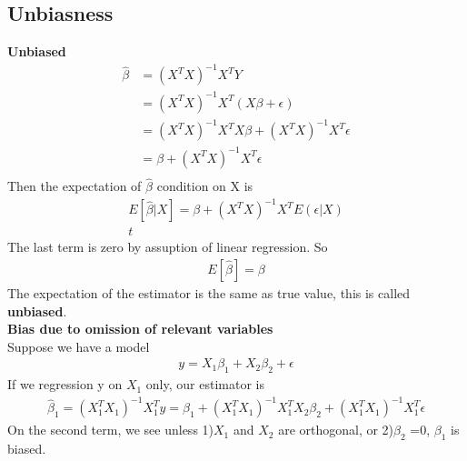 \documentclass[a4paper]{article}
\begin{document}
\subsection{Unbiasness}
{\bf Unbiased}\\
\begin{align*}
\hat \beta & = (X^T X)^{-1}X^TY\\
               & = (X^T X)^{-1}X^T(X \beta + \epsilon)\\
               & = (X^T X)^{-1}X^T X \beta   + (X^T X)^{-1}X^T \epsilon\\
               & = \beta +  (X^T X)^{-1}X^T \epsilon\\
\end{align*}
Then the expectation of $\hat \beta$ condition on X is
\begin{align*}
E[{\hat \beta|X}] = \beta + (X^TX)^{-1} X^T E(\epsilon|X)\\t
\end{align*}
The last term is zero by assuption of linear regression. So 
\begin{align*}
E[\hat \beta] = \beta
\end{align*}
The expectation of the estimator is the same as true value, this is called {\bf unbiased}. \\
{\bf Bias due to omission of relevant variables}\\
Suppose we have a model
\begin{align*}
y = X_1 \beta_1 + X_2 \beta_2 + \epsilon
\end{align*}
If we regression y on $X_1$ only, our estimator is
\begin{align*}
\hat \beta_1 = (X_1^T X_1)^{-1} X_1^T y = \beta_1 + (X_1^TX_1)^{-1}X_1^TX_2\beta_2 + (X_1^TX_1)^{-1}X_1^T\epsilon
\end{align*}
On the second term, we see unless 1)$X_1$ and $X_2$ are orthogonal, or 2)$\beta_2$ =0,  $\beta_1$ is biased.\\
\end{document}
